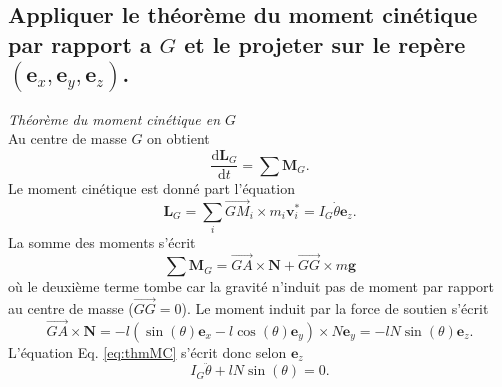 \documentclass[11pt,a4paper]{exam}
\newcommand{\exACDH}{\bm e_x}
\newcommand{\eyACDH}{\bm e_y}
\newcommand{\ezACDH}{\bm e_z}
\begin{document}
\begin{parts}
\part{Appliquer le théorème du moment cinétique par rapport a $G$ et le projeter sur le repère $(\exACDH, \eyACDH, \ezACDH)$.}
    \par\vspace{2mm}
    {\textit{Théorème du moment cinétique en $G$}}\\
    Au centre de masse $G$ on obtient
    \begin{equation}
         \frac{\mathrm d \bm{L}_G}{\mathrm d t} = \sum \bm M_G.\label{eq:thmMC}
    \end{equation}
    Le moment cinétique est donné part l'équation
    \begin{equation}
        \bm L_G = \sum_i \overrightarrow{GM}_i \times m_i \bm v_i^*= I_G \dot\theta \ezACDH.
    \end{equation}
    La somme des moments s'écrit
    \begin{equation}
        \sum \bm M_G = \overrightarrow{GA}\times \bm N + \overrightarrow{GG}\times m\bm g
    \end{equation}
    où le deuxième terme tombe car la gravité n'induit pas de moment par rapport au centre de masse ($\overrightarrow{GG}=0$).
    Le moment induit par la force de soutien s'écrit
    \begin{equation}
      \overrightarrow{GA}\times \bm N = -l(\sin(\theta)\exACDH - l\cos(\theta) \eyACDH)\times N\eyACDH= -lN\sin(\theta) \ezACDH.
    \end{equation}
    L'équation Eq. \eqref{eq:thmMC} s'écrit donc selon $\ezACDH$
    \begin{equation}
        I_G \ddot\theta + lN\sin(\theta) = 0.\label{eq:thmMC_ez}
    \end{equation}

\end{parts}
\end{document}
